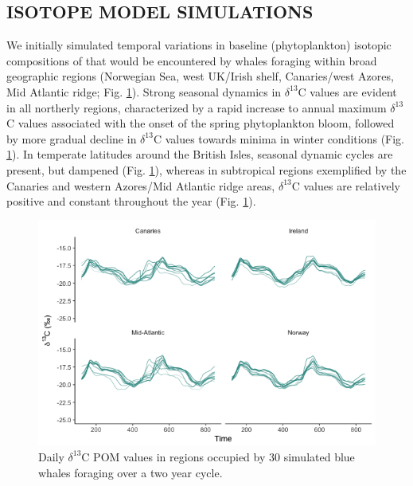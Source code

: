 \documentclass[a4paper,12pt]{article}
\begin{document}
\subsection*{ISOTOPE MODEL SIMULATIONS}
We initially simulated temporal variations in baseline (phytoplankton) isotopic compositions of that would be encountered by whales foraging within broad geographic regions (Norwegian Sea, west UK/Irish shelf, Canaries/west Azores, Mid Atlantic ridge; Fig. \ref{figs4}). 
Strong seasonal dynamics in $\delta^{13}$C values are evident in all northerly regions, characterized by a rapid increase to annual maximum $\delta^{13}$C values associated with the onset of the spring phytoplankton bloom, followed by more gradual decline in $\delta^{13}$C values towards minima in winter conditions (Fig. \ref{figs4}). 
In temperate latitudes around the British Isles, seasonal dynamic cycles are present, but dampened (Fig. \ref{figs4}), whereas in subtropical regions exemplified by the Canaries and western Azores/Mid Atlantic ridge areas, $\delta^{13}$C values are relatively positive and constant throughout the year (Fig. \ref{figs4}).
 
  \begin{figure}[!htbp]
    \centering
      \includegraphics[width=14cm]{figures/Figure-S4-all.png}
      \caption{Daily $\delta^{13}$C POM values in regions occupied by 30 simulated blue whales foraging over a two year cycle.}
      \label{figs4}
  \end{figure}
 
\end{document}

